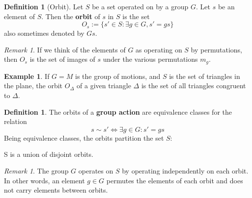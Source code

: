 \documentclass[12pt]{article}
\theoremstyle{definition}
\newtheorem{defn}[thm]{Definition}
\newtheorem{eg}[thm]{Example}
\theoremstyle{remark}
\newtheorem{rmk}[thm]{Remark}
\numberwithin{equation}{section}
\newcommand\B[1]{\textbf{ #1}}
\begin{document}
\vspace{15pt}


\begin{defn}[Orbit]
        Let $S$ be a set operated on by a group $G$. Let $s$ be an element of $S$. Then the \B{orbit} of $s$ in $S$ is the set \begin{equation}
                O_s := \{s' \in S: \exists g\in G, s' = gs\}
        \end{equation}
        also sometimes denoted by $Gs$. 
\end{defn}

\vspace{15pt}

\begin{rmk}
        If we think of the elements of $G$ as operating on $S$ by permutations, then $O_s$ is the set of images of $s$ under the various permutations $m_g$.
\end{rmk}


\vspace{15pt}

\begin{eg}
        If $G = M$ is the group of motions, and $S$ is the set of triangles in the plane, the orbit $O_{\Delta}$ of a given triangle $\Delta$ is the set of all triangles congruent to $\Delta$.
\end{eg}

\vspace{15pt}

\begin{defn}
        The orbits of a \B{group action} are equivalence classes for the relation \begin{equation}
                s \sim s'\iff \exists g \in G: s' = gs
        \end{equation}
        Being equivalence classes, the orbits partition the set $S$:\begin{centering}
                S is a union of disjoint orbits.
        \end{centering}
\end{defn}

\vspace{15pt}

\begin{rmk}
        The group $G$ operates on $S$ by operating independently on each orbit. In other words, an element $g \in G$ permutes the elements of each orbit and does not carry elements between orbits.
\end{rmk}

\vspace{15pt}
\end{document}
